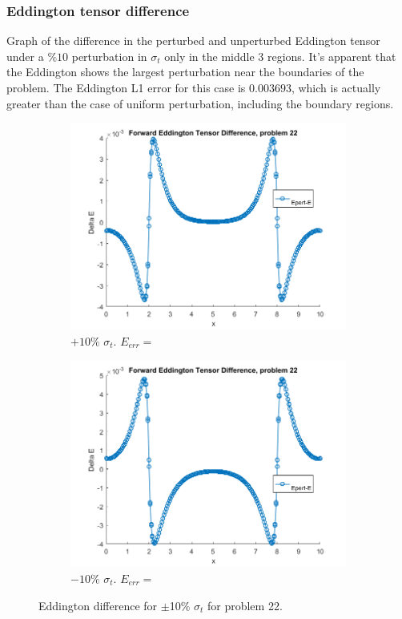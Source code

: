\documentclass{article}
\begin{document}
\subsubsection{Eddington tensor difference}
Graph of the difference in the perturbed and unperturbed Eddington tensor under a $\% 10$ perturbation in $\sigma_t$ only in the middle 3 regions. It's apparent that the Eddington shows the largest perturbation near the boundaries of the problem. The Eddington L1 error for this case is $0.003693$, which is actually greater than the case of uniform perturbation, including the boundary regions.
\begin{figure}[H]
\centering
\begin{subfigure}{.5\textwidth}
  \centering
  \includegraphics[width=1\linewidth]{p22deltaE.png}
  \caption{$+10\%$ $\sigma_t$. $E_{err}=$}
  \label{fig:sub1}
\end{subfigure}%
\begin{subfigure}{.5\textwidth}
  \centering
  \includegraphics[width=1\linewidth]{p22deltaEdst-10.png}
  \caption{$-10\%$ $\sigma_t$. $E_{err}=$}
  \label{fig:sub2}
\end{subfigure}
\caption{Eddington difference for $\pm$10$\%$ $\sigma_t$ for problem 22.}
\label{fig:test}
\end{figure}
\end{document}
